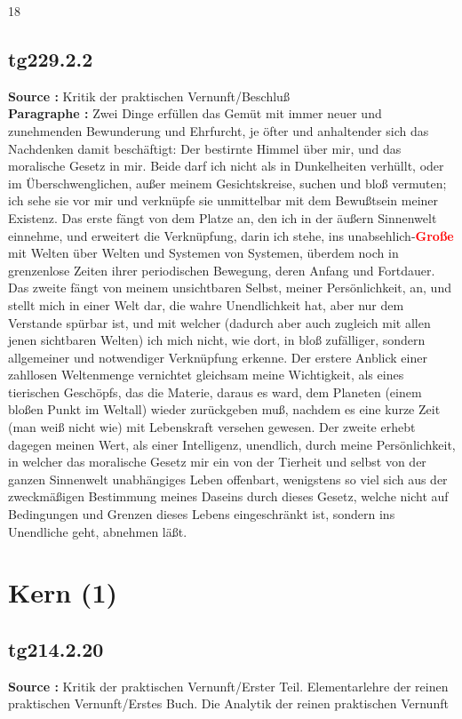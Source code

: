 \documentclass[a4paper,12pt,twoside]{book}
\newcommand{\match}[1]{\textcolor{red}{\textbf{#1}}}
\newcommand{\unnumberedsection}[1]{
	\section*{#1}
	\addcontentsline{toc}{section}{#1}
	\markright{#1}
}
\begin{document}
	
	18
	
	
	
	\subsection*{tg229.2.2} 
	\textbf{Source : }Kritik der praktischen Vernunft/Beschluß\\  
	
	\textbf{Paragraphe : }Zwei Dinge erfüllen das Gemüt mit immer neuer und zunehmenden Bewunderung und Ehrfurcht, je öfter und anhaltender sich das Nachdenken damit beschäftigt: Der bestirnte Himmel über mir, und das moralische Gesetz in mir. Beide darf ich nicht als in Dunkelheiten verhüllt, oder im Überschwenglichen, außer meinem Gesichtskreise, suchen und bloß vermuten; ich sehe sie vor mir und verknüpfe sie unmittelbar mit dem Bewußtsein meiner Existenz. Das erste fängt von dem Platze an, den ich in der äußern Sinnenwelt einnehme, und erweitert die Verknüpfung, darin ich stehe, ins unabsehlich-\match{Große} mit Welten über Welten und Systemen von Systemen, überdem noch in grenzenlose Zeiten ihrer periodischen Bewegung, deren Anfang und Fortdauer. Das zweite fängt von meinem unsichtbaren Selbst, meiner Persönlichkeit, an, und stellt mich in einer Welt dar, die wahre Unendlichkeit hat, aber nur dem Verstande spürbar ist, und mit welcher (dadurch aber auch zugleich mit allen jenen sichtbaren Welten) ich mich nicht, wie dort, in bloß zufälliger, sondern allgemeiner und notwendiger Verknüpfung erkenne. Der erstere Anblick einer zahllosen Weltenmenge vernichtet gleichsam meine Wichtigkeit, als eines tierischen Geschöpfs, das die Materie, daraus es ward, dem Planeten (einem bloßen Punkt im Weltall) wieder zurückgeben muß, nachdem es eine kurze Zeit (man weiß nicht wie) mit Lebenskraft versehen gewesen. Der zweite erhebt dagegen meinen Wert, als einer Intelligenz, unendlich, durch meine Persönlichkeit, in welcher das moralische Gesetz mir ein von der Tierheit und selbst von der ganzen Sinnenwelt unabhängiges Leben offenbart, wenigstens so viel sich aus der zweckmäßigen Bestimmung meines Daseins durch dieses Gesetz, welche nicht auf Bedingungen und Grenzen dieses Lebens eingeschränkt ist, sondern ins Unendliche geht, abnehmen läßt. 
	
	\unnumberedsection{Kern (1)} 
	\subsection*{tg214.2.20} 
	\textbf{Source : }Kritik der praktischen Vernunft/Erster Teil. Elementarlehre der reinen praktischen Vernunft/Erstes Buch. Die Analytik der reinen praktischen Vernunft\\  
	
\end{document}
